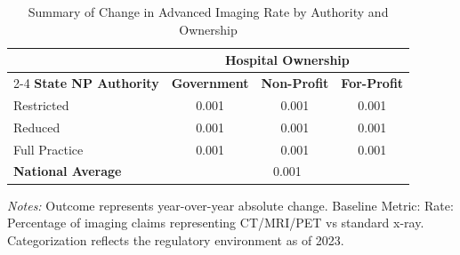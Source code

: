 \begin{table}[htbp]
    \centering
    \caption{Summary of Change in Advanced Imaging Rate by Authority and Ownership}
    \label{tab:d_partb_imaging_adv_rate_own}
    \vspace{0.2cm}
    \begin{tabular}{lccc}
        \toprule
        & \multicolumn{3}{c}{\textbf{Hospital Ownership}} \\
        \cmidrule(lr){2-4}
        \textbf{State NP Authority} & \textbf{Government} & \textbf{Non-Profit} & \textbf{For-Profit} \\
        \midrule
        Restricted & 0.001 & 0.001 & 0.001 \\
        Reduced & 0.001 & 0.001 & 0.001 \\
        Full Practice & 0.001 & 0.001 & 0.001 \\
        \midrule
        \textbf{National Average} & \multicolumn{3}{c}{0.001} \\
        \bottomrule
    \end{tabular}
    \vspace{0.1cm}
    \begin{minipage}{0.85\textwidth}
        \footnotesize \textit{Notes:} Outcome represents year-over-year absolute change. Baseline Metric: Rate: Percentage of imaging claims representing CT/MRI/PET vs standard x-ray. Categorization reflects the regulatory environment as of 2023.
    \end{minipage}
\end{table}